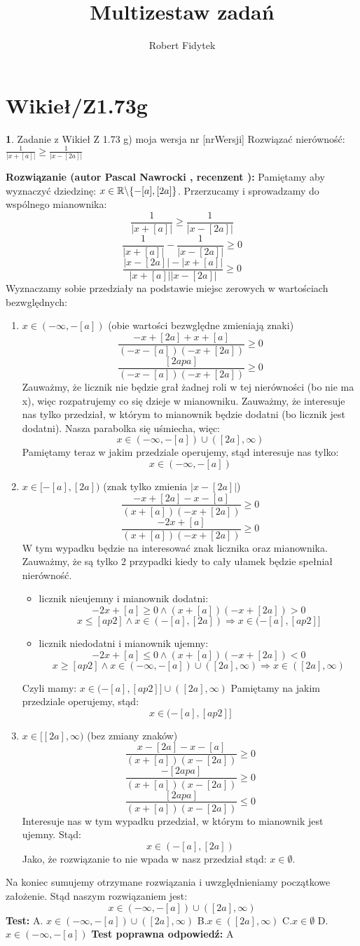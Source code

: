 \documentclass[12pt, a4paper]{article}
\title{Multizestaw zadań}
\author{Robert Fidytek}
\date{}
\theoremstyle{definition} %
\newtheorem{zad}{}
\newcommand{\kategoria}[1]{\section{#1}} %
\newcommand{\zadStart}[1]{\begin{zad}#1\newline} %
\newcommand{\zadStop}{\end{zad}}   %
\newcommand{\rozwStart}[2]{\noindent \textbf{Rozwiązanie (autor #1 , recenzent #2): }\newline} %
\newcommand{\odpStop}{\newline}                                             %
\newcommand{\testStart}{\noindent \textbf{Test:}\newline} %
\newcommand{\testStop}{\newline} %
\newcommand{\kluczStart}{\noindent \textbf{Test poprawna odpowiedź:}\newline} %
\newcommand{\kluczStop}{\newline} %
\begin{document}
\maketitle


\kategoria{Wikieł/Z1.73g}
\zadStart{Zadanie z Wikieł Z 1.73 g) moja wersja nr [nrWersji]}
Rozwiązać nierówność: $\frac{1}{|x+[a]|}\geq\frac{1}{|x-[2a]|}$
\zadStop
\rozwStart{Pascal Nawrocki}{}
Pamiętamy aby wyznaczyć dziedzinę: $x\in\mathbb{R}\symbol{92}\{-[a],[2a]\}$.
Przerzucamy i sprowadzamy do wspólnego mianownika:
$$\frac{1}{|x+[a]|}\geq\frac{1}{|x-[2a]|}$$
$$\frac{1}{|x+[a]|}-\frac{1}{|x-[2a]|}\geq0$$
$$\frac{|x-[2a]|-|x+[a]|}{|x+[a]||x-[2a]|}\geq0$$
Wyznaczamy sobie przedziały na podstawie miejsc zerowych w wartościach bezwględnych:
\begin{enumerate}
\item $x\in(-\infty,-[a])$ (obie wartości bezwględne zmieniają znaki)
$$\frac{-x+[2a]+x+[a]}{(-x-[a])(-x+[2a])}\geq0$$
$$\frac{[2apa]}{(-x-[a])(-x+[2a])}\geq0$$
Zauważmy, że licznik nie będzie grał żadnej roli w tej nierówności (bo nie ma x), więc rozpatrujemy co się dzieje w mianowniku. Zauważmy, że interesuje nas tylko przedział, w którym to mianownik będzie dodatni (bo licznik jest dodatni). Nasza parabolka się uśmiecha, więc:
$$x\in(-\infty,-[a])\cup([2a],\infty)$$
Pamiętamy teraz w jakim przedziale operujemy, stąd interesuje nas tylko:
$$x\in(-\infty,-[a])$$
\item $x\in[-[a],[2a])$ (znak tylko zmienia $|x-[2a]|$)
$$\frac{-x+[2a]-x-[a]}{(x+[a])(-x+[2a])}\geq0$$
$$\frac{-2x+[a]}{(x+[a])(-x+[2a])}\geq0$$
W tym wypadku będzie na interesować znak licznika oraz mianownika. Zauważmy, że są tylko 2 przypadki kiedy to cały ułamek będzie spełniał nierówność.
\begin{itemize}
\item licznik nieujemny i mianownik dodatni:
$$-2x+[a]\geq0 \wedge (x+[a])(-x+[2a])>0$$
$$x\leq[ap2] \wedge x\in(-[a],[2a])\Rightarrow x\in(-[a],[ap2]]$$
\item licznik niedodatni i mianownik ujemny:
$$-2x+[a]\leq0 \wedge (x+[a])(-x+[2a])<0$$
$$x\geq[ap2] \wedge x\in(-\infty,-[a])\cup([2a],\infty)\Rightarrow x\in([2a],\infty)$$
\end{itemize}
Czyli mamy: $x\in(-[a],[ap2]]\cup([2a],\infty)$
Pamiętamy na jakim przedziale operujemy, stąd:
$$x\in(-[a],[ap2]]$$
\item $x\in[[2a],\infty)$ (bez zmiany znaków)
$$\frac{x-[2a]-x-[a]}{(x+[a])(x-[2a])}\geq0$$
$$\frac{-[2apa]}{(x+[a])(x-[2a])}\geq0$$
$$\frac{[2apa]}{(x+[a])(x-[2a])}\leq0$$
Interesuje nas w tym wypadku przedział, w którym to mianownik jest ujemny. Stąd:
$$x\in(-[a],[2a])$$
Jako, że rozwiązanie to nie wpada w nasz przedział stąd: $x\in\emptyset$.
\end{enumerate}
Na koniec sumujemy otrzymane rozwiązania i uwzględnieniamy początkowe założenie. Stąd naszym rozwiązaniem jest: 
$$x\in(-\infty,-[a])\cup([2a],\infty)$$
\odpStop
\testStart
A. $x\in(-\infty,-[a])\cup([2a],\infty)$
B.$x\in([2a],\infty)$
C.$x\in\emptyset$
D.$x\in(-\infty,-[a])$
\testStop
\kluczStart
A
\kluczStop
\end{document}
